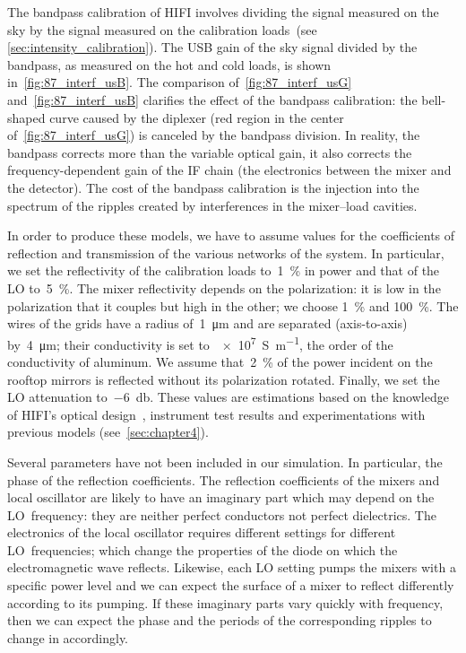 The bandpass calibration of HIFI involves dividing the signal measured on the sky by the signal measured on the calibration loads~(see \cref{sec:intensity_calibration}).
The USB gain of the sky signal divided by the bandpass, as measured on the hot and cold loads, is shown in~\cref{fig:87_interf_usB}.
The comparison of~\cref{fig:87_interf_usG} and~\cref{fig:87_interf_usB} clarifies the effect of the bandpass calibration: the bell-shaped curve caused by the diplexer (red region in the center of~\cref{fig:87_interf_usG}) is canceled by the bandpass division.
In reality, the bandpass corrects more than the variable optical gain, it also corrects the frequency-dependent gain of the IF chain (the electronics between the mixer and the detector).
The cost of the bandpass calibration is the injection into the spectrum of the ripples created by interferences in the mixer--load cavities.

In order to produce these models, we have to assume values for the coefficients of reflection and transmission of the various networks of the system.
In particular, we set the reflectivity of the calibration loads to~\SI{1}{\percent} in power and that of the LO to~\SI{5}{\percent}.
The mixer reflectivity depends on the polarization: it is low in the polarization that it couples but high in the other; we choose \SI{1}{\percent} and \SI{100}{\percent}.
The wires of the grids have a radius of~\SI{1}{\micro\meter} and are separated (axis-to-axis) by~\SI{4}{\micro\meter}; their conductivity is set to~\SI{e7}{\siemens\per\meter}, the order of the conductivity of aluminum.
We assume that~\SI{2}{\percent} of the power incident on the rooftop mirrors is reflected without its polarization rotated.
Finally, we set the LO attenuation to~\SI{-6}{\decibel}.
These values are estimations based on the knowledge of HIFI's optical design~\parencite[][for example]{jellema2003csa}, instrument test results and experimentations with previous models (see~\cref{sec:chapter4}).

Several parameters have not been included in our simulation.
In particular, the phase of the reflection coefficients.
The reflection coefficients of the mixers and local oscillator are likely to have an imaginary part which may depend on the LO~frequency: they are neither perfect conductors not perfect dielectrics.
The electronics of the local oscillator requires different settings for different LO~frequencies; which change the properties of the diode on which the electromagnetic wave reflects.
Likewise, each LO setting pumps the mixers with a specific power level and we can expect the surface of a mixer to reflect differently according to its pumping.
If these imaginary parts vary quickly with frequency, then we can expect the phase and the periods of the corresponding ripples to change in accordingly.


